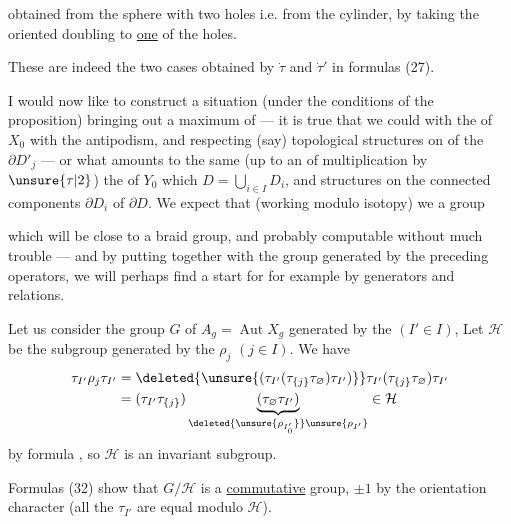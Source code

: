 obtained from the sphere with two holes i.e. from the cylinder, by taking the oriented doubling  to \uline{one} of the holes. 

These are indeed the two cases obtained  by $\dot\tau$ and $\dot\tau'$ in formulas (27).

I would now like to construct a situation (under the conditions of the proposition) bringing out a maximum of  --- it is true that we could  with  the  of $X_0$  with the antipodism\inserted{$\tau$},  and respecting (say) topological  structures on  of the $\partial D'_j$ --- or what  amounts to the same (up to an  of multiplication by $\unsure{\tau|2}$) the  of $Y_0$ which   $D=\bigcup_{i\in I}D_i$, and   structures on  the connected components $\partial D_i$ of $\partial D$. We expect that (working modulo isotopy) we  a group



which will be close to a braid group, and probably computable without much trouble --- and by putting  together with the group generated by the preceding operators, we will perhaps find a start for  for example  by generators  and relations.

Let us consider the group $G$ of $A_g=\operatorname{Aut}X_g$ generated by the  $(I'\in I)$,  Let $\mathcal H$  be the subgroup generated by the $\rho_j$ $(j\in I)$. We have
\[
\begin{aligned}
\tau_{I'}\rho_j\tau_{I'}
&=\deleted{\unsure{(\tau_{I'}(\tau_{\{j\}}\tau_{\varnothing})\tau_{I'})}}
\tau_{I'}(\tau_{\{j\}}\tau_{\varnothing})\tau_{I'}\\
&=(\tau_{I'}\tau_{\{j\}})
\underbrace{(\tau_{\varnothing}\tau_{I'})}_{\deleted{\unsure{\rho_{I'_0}}}\unsure{\rho_{I'}}}
\in\mathcal H
\end{aligned}
\]
by formula , so $\mathcal H$ is an invariant subgroup.

Formulas (32) show that $G/\mathcal H$ is a \uline{commutative} group,  $\pm1$ by the orientation character (all the $\tau_{I'}$ are equal modulo $\mathcal H$).

